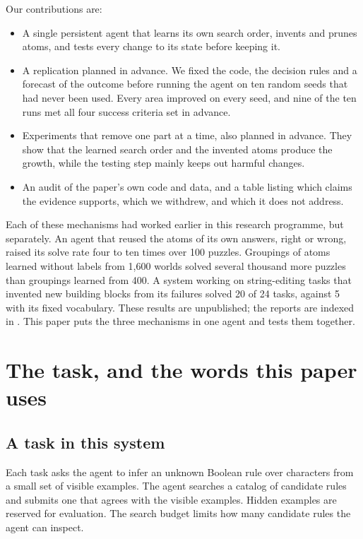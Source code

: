 \documentclass[11pt]{article}
\begin{document}
Our contributions are:
\begin{itemize}[leftmargin=*,itemsep=2pt]
\item A single persistent agent that learns its own search order, invents and prunes atoms, and tests every change to its state before keeping it.
\item A replication planned in advance. We fixed the code, the decision rules and a forecast of the outcome before running the agent on ten random seeds that had never been used. Every area improved on every seed, and nine of the ten runs met all four success criteria set in advance.
\item Experiments that remove one part at a time, also planned in advance. They show that the learned search order and the invented atoms produce the growth, while the testing step mainly keeps out harmful changes.
\item An audit of the paper's own code and data, and a table listing which claims the evidence supports, which we withdrew, and which it does not address.
\end{itemize}

Each of these mechanisms had worked earlier in this research programme, but separately. An agent that reused the atoms of its own answers, right or wrong, raised its solve rate four to ten times over 100 puzzles. Groupings of atoms learned without labels from 1,600 worlds solved several thousand more puzzles than groupings learned from 400. A system working on string-editing tasks that invented new building blocks from its failures solved 20 of 24 tasks, against 5 with its fixed vocabulary. These results are unpublished; the reports are indexed in . This paper puts the three mechanisms in one agent and tests them together.

\section{The task, and the words this paper uses}

\subsection{A task in this system}

Each task asks the agent to infer an unknown Boolean rule over characters from a small set of visible examples. The agent searches a catalog of candidate rules and submits one that agrees with the visible examples. Hidden examples are reserved for evaluation. The search budget limits how many candidate rules the agent can inspect.
\end{document}
